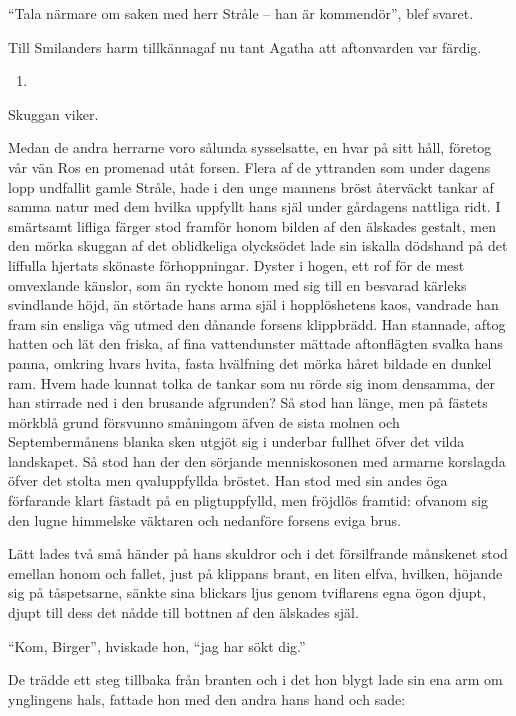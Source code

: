 ``Tala närmare om saken med herr Stråle -- han är kommendör'', blef
svaret.

Till Smilanders harm tillkännagaf nu tant Agatha att aftonvarden var
färdig.

\begin{enumerate}
\def\labelenumi{\arabic{enumi}.}
\setcounter{enumi}{25}
\tightlist
\item
\end{enumerate}

Skuggan viker.

Medan de andra herrarne voro sålunda sysselsatte, en hvar på sitt håll,
företog vår vän Ros en promenad utåt forsen. Flera af de yttranden som
under dagens lopp undfallit gamle Stråle, hade i den unge mannens bröst
återväckt tankar af samma natur med dem hvilka uppfyllt hans själ under
gårdagens nattliga ridt. I smärtsamt lifliga färger stod framför honom
bilden af den älskades gestalt, men den mörka skuggan af det oblidkeliga
olycksödet lade sin iskalla dödshand på det liffulla hjertats skönaste
förhoppningar. Dyster i hogen, ett rof för de mest omvexlande känslor,
som än ryckte honom med sig till en besvarad kärleks svindlande höjd, än
störtade hans arma själ i hopplöshetens kaos, vandrade han fram sin
ensliga väg utmed den dånande forsens klippbrädd. Han stannade, aftog
hatten och lät den friska, af fina vattendunster mättade aftonflägten
svalka hans panna, omkring hvars hvita, fasta hvälfning det mörka håret
bildade en dunkel ram. Hvem hade kunnat tolka de tankar som nu rörde sig
inom densamma, der han stirrade ned i den brusande afgrunden? Så stod
han länge, men på fästets mörkblå grund försvunno småningom äfven de
sista molnen och Septembermånens blanka sken utgjöt sig i underbar
fullhet öfver det vilda landskapet. Så stod han der den sörjande
menniskosonen med armarne korslagda öfver det stolta men qvaluppfyllda
bröstet. Han stod med sin andes öga förfarande klart fästadt på en
pligtuppfylld, men fröjdlös framtid: ofvanom sig den lugne himmelske
väktaren och nedanföre forsens eviga brus.

Lätt lades två små händer på hans skuldror och i det försilfrande
månskenet stod emellan honom och fallet, just på klippans brant, en
liten elfva, hvilken, höjande sig på tåspetsarne, sänkte sina blickars
ljus genom tviflarens egna ögon djupt, djupt till dess det nådde till
bottnen af den älskades själ.

``Kom, Birger'', hviskade hon, ``jag har sökt dig.''

De trädde ett steg tillbaka från branten och i det hon blygt lade sin
ena arm om ynglingens hals, fattade hon med den andra hans hand och
sade:

